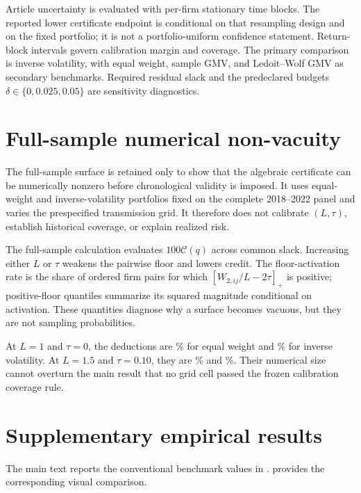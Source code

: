Article uncertainty is evaluated with per-firm stationary time blocks. The
reported lower certificate endpoint is conditional on that resampling design
and on the fixed portfolio; it is not a portfolio-uniform confidence statement.
Return-block intervals govern calibration margin and coverage. The primary
comparison is inverse volatility, with equal weight, sample GMV, and
Ledoit--Wolf GMV as secondary benchmarks. Required residual slack and the
predeclared budgets $\delta\in\{0,0.025,0.05\}$ are sensitivity diagnostics.

\section{Full-sample numerical non-vacuity}\label{sec:nonvacuity-appendix}

The full-sample surface is retained only to show that the algebraic certificate
can be numerically nonzero before chronological validity is imposed. It uses
equal-weight and inverse-volatility portfolios fixed on the complete
2018--2022 panel and varies the prespecified transmission grid. It therefore
does not calibrate $(L,\tau)$, establish historical coverage, or explain
realized risk.

The full-sample calculation evaluates $100\mathcal C(q)$ across common slack.
Increasing either $L$ or $\tau$ weakens the pairwise floor and lowers credit.
The floor-activation rate is the share of ordered firm pairs for which
$[W_{2,ij}/L-2\tau]_+$ is positive; positive-floor quantiles summarize its
squared magnitude conditional on activation. These quantities diagnose why a
surface becomes vacuous, but they are not sampling probabilities.

At $L=1$ and $\tau=0$, the deductions are
\% for equal weight
and \% for
inverse volatility. At $L=1.5$ and $\tau=0.10$, they are
\% and
\%.
Their numerical size cannot overturn the main result that no grid cell passed
the frozen calibration coverage rule.
\fi

\section{Supplementary empirical results}
\label{sec:p3-supplementary-results}

The main text reports the conventional benchmark values in
.
 provides the corresponding visual comparison.

